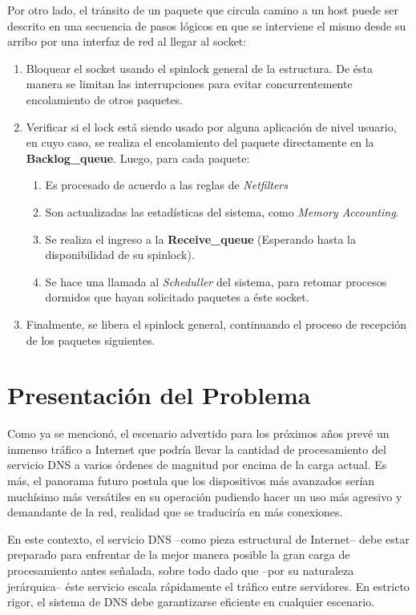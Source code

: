 Por otro lado, el tránsito de un paquete que circula camino a un host puede ser descrito en una secuencia de pasos lógicos en que se interviene el mismo desde su arribo por una interfaz de red al llegar al socket:
\begin{enumerate}
\item Bloquear el socket usando el spinlock general de la estructura. De ésta manera se limitan las interrupciones para evitar concurrentemente encolamiento de otros paquetes.
\item Verificar si el lock está siendo usado por alguna aplicación de nivel usuario, en cuyo caso, se realiza el encolamiento del paquete directamente en la \textbf{Backlog\_queue}. Luego, para cada paquete:
	\begin{enumerate}
	\item Es procesado de acuerdo a las reglas de \emph{Netfilters}
	\item Son actualizadas las estadísticas del sistema, como \emph{Memory Accounting}.
	\item Se realiza el ingreso a la \textbf{Receive\_queue} (Esperando hasta la disponibilidad de su spinlock).
	\item Se hace una llamada al \emph{Scheduller} del sistema, para retomar procesos dormidos que hayan solicitado paquetes a éste socket.
	\end{enumerate}
\item Finalmente, se libera el spinlock general, continuando el proceso de recepción de los paquetes siguientes.
\end{enumerate}

\section{Presentación del Problema}
Como ya se mencionó, el escenario advertido para los próximos años prevé un inmenso tráfico a Internet que podría llevar la cantidad de procesamiento del servicio DNS a varios órdenes de magnitud por encima de la carga actual. Es más, el panorama futuro postula que los dispositivos más avanzados serían muchísimo más versátiles en su operación pudiendo hacer un uso más agresivo y demandante de la red, realidad que se traduciría en más conexiones.

En este contexto, el servicio DNS --como pieza estructural de Internet-- debe estar preparado para enfrentar de la mejor manera posible la gran carga de procesamiento antes señalada, sobre todo dado que --por su naturaleza jerárquica-- éste servicio escala rápidamente el tráfico entre servidores. En estricto rigor, el sistema de DNS debe garantizarse eficiente en cualquier escenario.

